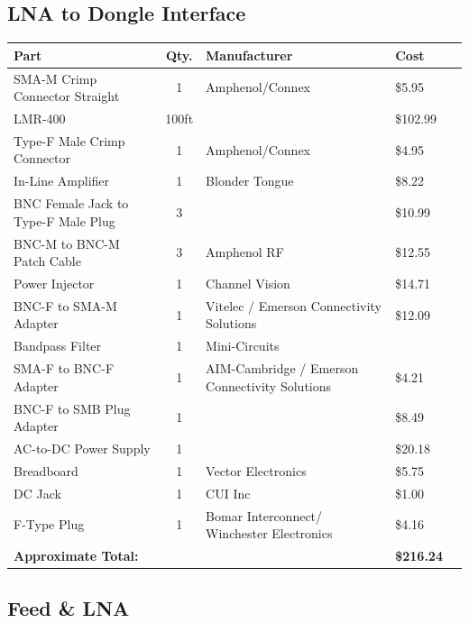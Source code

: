 \documentclass[11pt]{article} %
\begin{document}
\subsection{LNA to Dongle Interface}

\begin{tabular}{| p{6cm} | c | p{5cm} | l | c |}
\hline
\textbf{Part} & \textbf{Qty.} & \textbf{Manufacturer} & \textbf{Cost} \\ \hline \hline
SMA-M Crimp Connector Straight & 1 & Amphenol/Connex & \$5.95 \\ \hline
LMR-400 & 100ft & & \$102.99\\ \hline
Type-F Male Crimp Connector & 1 & Amphenol/Connex &\$4.95 \\ \hline
In-Line Amplifier & 1 & Blonder Tongue & \$8.22 \\ \hline
BNC Female Jack to Type-F Male Plug & 3 & & \$10.99 \\ \hline
BNC-M to BNC-M Patch Cable & 3 & Amphenol RF & \$12.55 \\ \hline
Power Injector & 1 & Channel Vision & \$14.71 \\ \hline
BNC-F to SMA-M Adapter & 1 & Vitelec / Emerson Connectivity Solutions & \$12.09 \\ \hline
Bandpass Filter & 1 & Mini-Circuits & \\ \hline
SMA-F to BNC-F Adapter & 1 & AIM-Cambridge / Emerson Connectivity Solutions & \$4.21 \\ \hline
BNC-F to SMB Plug Adapter & 1 & & \$8.49 \\ \hline
AC-to-DC Power Supply & 1 & & \$20.18 \\ \hline
Breadboard & 1 & Vector Electronics & \$5.75 \\ \hline
DC Jack & 1 & CUI Inc & \$1.00 \\ \hline
F-Type Plug & 1 & Bomar Interconnect/ Winchester Electronics & \$4.16\\ \hline
\textbf{Approximate Total:} & & & \textbf{\$216.24} \\ \hline
\end{tabular}

\subsection{Feed \& LNA}
\end{document}
